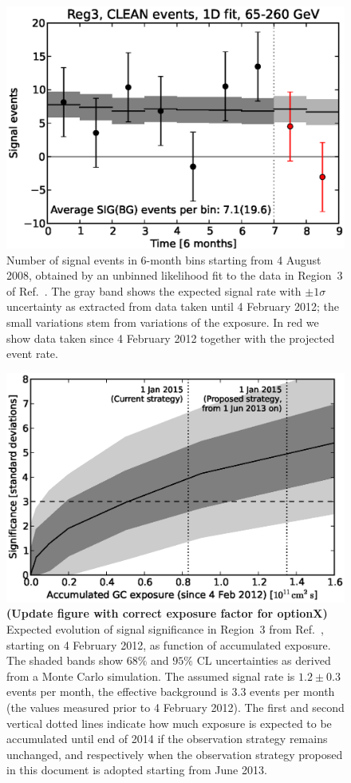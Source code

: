 \documentclass[aps,prd,superscriptaddress,showpacs,nofootinbib,fixlfloat, 12pt]{revtex4-1}
\begin{document}
\begin{figure}[h]
  \begin{center}
    \includegraphics[width=0.60\linewidth]{plots/semester_fluxes.eps}
    \vspace{-0.5cm}
  \end{center}
  \caption{Number of signal events in 6-month bins starting from 4
    August 2008, obtained by an unbinned likelihood fit to the data in
    Region~3 of Ref.~\cite{Weniger:2012}. The gray band shows the expected
    signal rate with $\pm1\sigma$ uncertainty as extracted from data taken until
    4 February 2012; the small variations stem from variations of the
    exposure. In red we show data taken since 4 February 2012
    together with the projected event rate.}
  \label{fig:semester_fluxes}
\end{figure}

\begin{figure}[h]
  \begin{center}
    \includegraphics[width=0.6\linewidth]{plots/projection.eps}
    \vspace{-0.5cm}
  \end{center}
  \caption{
    \textbf{(Update figure with correct exposure factor for optionX)}
    Expected evolution of signal significance in Region~3 from
    Ref.~\cite{Weniger:2012}, starting on 4
    February 2012, as function of
    accumulated exposure.  The shaded bands show $68\%$ and $95\%$ CL
    uncertainties as derived from a Monte Carlo simulation.  The assumed
    signal rate is $1.2\pm 0.3$ events per month, the effective background is
    $3.3$ events per month (the values measured prior to 4 February 2012).
    The first and second vertical dotted lines indicate how much exposure is
    expected to be accumulated until end of 2014 if the observation strategy remains
    unchanged, and respectively when the observation strategy proposed in this
    document is adopted starting from June 2013.}
  \label{fig:projection}
\end{figure}
\end{document}
